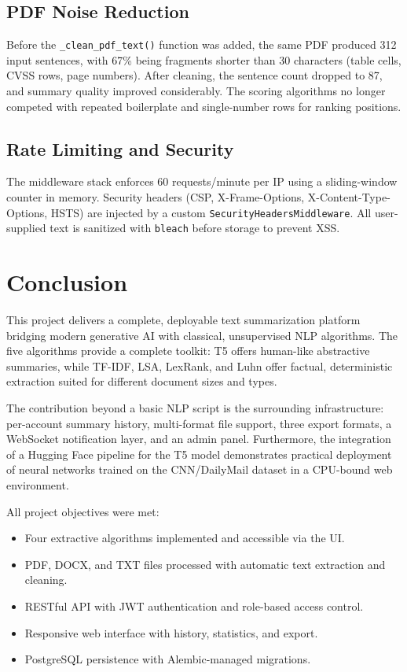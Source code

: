 \documentclass[12pt,a4paper]{article}
\begin{document}
\subsection{PDF Noise Reduction}

Before the \texttt{\_clean\_pdf\_text()} function was added, the same PDF produced 312 input sentences, with 67\% being fragments shorter than 30 characters (table cells, CVSS rows, page numbers). After cleaning, the sentence count dropped to 87, and summary quality improved considerably. The scoring algorithms no longer competed with repeated boilerplate and single-number rows for ranking positions.

\subsection{Rate Limiting and Security}

The middleware stack enforces 60 requests/minute per IP using a sliding-window counter in memory. Security headers (CSP, X-Frame-Options, X-Content-Type-Options, HSTS) are injected by a custom \texttt{SecurityHeadersMiddleware}. All user-supplied text is sanitized with \texttt{bleach} before storage to prevent XSS.

\section{Conclusion}

This project delivers a complete, deployable text summarization platform bridging modern generative AI with classical, unsupervised NLP algorithms. The five algorithms provide a complete toolkit: T5 offers human-like abstractive summaries, while TF-IDF, LSA, LexRank, and Luhn offer factual, deterministic extraction suited for different document sizes and types.

The contribution beyond a basic NLP script is the surrounding infrastructure: per-account summary history, multi-format file support, three export formats, a WebSocket notification layer, and an admin panel. Furthermore, the integration of a Hugging Face pipeline for the T5 model demonstrates practical deployment of neural networks trained on the CNN/DailyMail dataset in a CPU-bound web environment.

All project objectives were met:
\begin{itemize}[noitemsep]
  \item Four extractive algorithms implemented and accessible via the UI.
  \item PDF, DOCX, and TXT files processed with automatic text extraction and cleaning.
  \item RESTful API with JWT authentication and role-based access control.
  \item Responsive web interface with history, statistics, and export.
  \item PostgreSQL persistence with Alembic-managed migrations.
\end{itemize}
\end{document}
